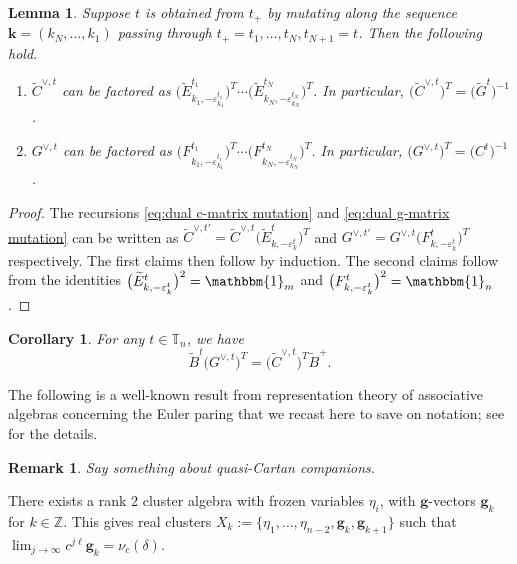\documentclass{amsart}
\newtheorem{corollary}[theorem]{Corollary}
\newtheorem{lemma}[theorem]{Lemma}
\newtheorem{remark}[theorem]{Remark}
\numberwithin{theorem}{section}
\newcommand{\bfg}{\boldsymbol{g}}
\newcommand{\bfk}{{\boldsymbol{k}}}
\newcommand{\TT}{\mathbb{T}}
\newcommand{\ZZ}{\mathbb{Z}}
\newcommand{\bOne}{\mathbbm{1}}
\begin{document}
  \begin{lemma}
    \label{le:factorize dual matrices}
    Suppose $t$ is obtained from $t_+$ by mutating along the sequence $\bfk=(k_N,\ldots,k_1)$ passing through $t_+=t_1,\ldots,t_N,t_{N+1}=t$.
    Then the following hold.
    \begin{enumerate}
      \item $\widetilde C^{\vee,t}$ can be factored as $\big(\widetilde E^{t_1}_{k_1,-\varepsilon^{t_1}_{k_1}}\big)^T \cdots \big(\widetilde E^{t_N}_{k_N,-\varepsilon^{t_N}_{k_N}}\big)^T$.
        In particular, $\big(\widetilde C^{\vee,t}\big)^T=\big(\widetilde G^t\big)^{-1}$.
      \item $G^{\vee,t}$ can be factored as $\big(F^{t_1}_{k_1,-\varepsilon^{t_1}_{k_1}}\big)^T \cdots \big(F^{t_N}_{k_N,-\varepsilon^{t_N}_{k_N}}\big)^T$.
        In particular, $\big(G^{\vee,t}\big)^T=\big(C^t\big)^{-1}$.
    \end{enumerate}
  \end{lemma}
  \begin{proof}
    The recursions \eqref{eq:dual c-matrix mutation} and \eqref{eq:dual g-matrix mutation} can be written as $\widetilde C^{\vee,t'}=\widetilde C^{\vee,t} \big(\widetilde E^t_{k,-\varepsilon^t_k}\big)^T$ and $G^{\vee,t'}=G^{\vee,t} \big(F^t_{k,-\varepsilon^t_k}\big)^T$ respectively.
    The first claims then follow by induction.
    The second claims follow from the identities $\big(\widetilde E^t_{k,-\varepsilon^t_k}\big)^2=\bOne_m$ and $\big(F^t_{k,-\varepsilon^t_k}\big)^2=\bOne_n$.
  \end{proof}

  \begin{corollary}
    \label{cor:dual BG=CB}
    For any $t\in\TT_n$, we have
    \[\widetilde B^t \big(G^{\vee,t}\big)^T=\big(\widetilde C^{\vee,t}\big)^T \widetilde B^+.\]
  \end{corollary}

  The following is a well-known result from representation theory of associative algebras concerning the Euler paring that we recast here to save on notation; see \cite{dlab_ringel?} for the details.
  \begin{remark}
    Say something about quasi-Cartan companions.
  \end{remark}

  There exists a rank 2 cluster algebra with frozen variables $\eta_i$, with $\bfg$-vectors $\bfg_k$ for $k\in\ZZ$.
  This gives real clusters $X_k:=\{\eta_1,\ldots,\eta_{n-2},\bfg_k,\bfg_{k+1}\}$ such that $\lim_{j\to\infty} c^{j\ell}\bfg_k=\nu_c(\delta)$.
\end{document}

